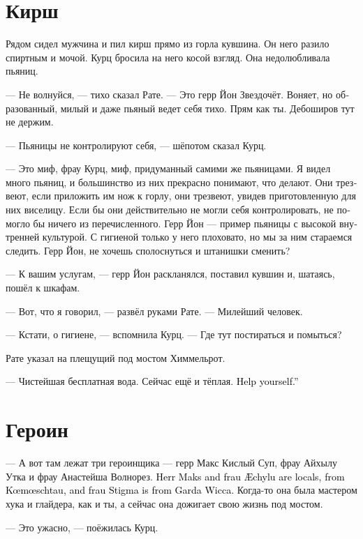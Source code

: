 \documentclass[a4paper,12pt,fleqn]{book}\usepackage{cooltooltips}\usepackage{polyglossia}\setdefaultlanguage[babelshorthands=true]{russian}\setotherlanguage{english}\defaultfontfeatures{Ligatures=TeX,Mapping=tex-text} \usepackage{xcolor}\definecolor{lightgray}{HTML}{bbbbbb}\color{lightgray}\newcommand{\ml}[3]{\textenglish{\textcolor{black}{#3}}}
\begin{document}
\section{Кирш}

Рядом сидел мужчина и пил кирш прямо из горла кувшина.
Он него разило спиртным и мочой.
Курц бросила на него косой взгляд.
Она недолюбливала пьяниц.

--- Не волнуйся, --- тихо сказал Рате.
--- Это герр Йон Звездочёт.
Воняет, но образованный, милый и даже пьяный ведет себя тихо.
Прям как ты.
Дебоширов тут не держим.

--- Пьяницы не контролируют себя, --- шёпотом сказал Курц.

--- Это миф, фрау Курц, миф, придуманный самими же пьяницами.
Я видел много пьяниц, и большинство из них прекрасно понимают, что делают.
Они трезвеют, если приложить им нож к горлу, они трезвеют, увидев приготовленную для них виселицу.
Если бы они действительно не могли себя контролировать, не помогло бы ничего из перечисленного.
Герр Йон --- пример пьяницы с высокой внутренней культурой.
С гигиеной только у него плоховато, но мы за ним стараемся следить.
Герр Йон, не хочешь сполоснуться и штанишки сменить?

--- К вашим услугам, --- герр Йон раскланялся, поставил кувшин и, шатаясь, пошёл к шкафам.

--- Вот, что я говорил, --- развёл руками Рате.
--- Милейший человек.

--- Кстати, о гигиене, --- вспомнила Курц.
--- Где тут постираться и помыться?

Рате указал на плещущий под мостом Химмельрот.

--- Чистейшая бесплатная вода.
Сейчас ещё и тёплая.
\ml{$0$}
{Ни в чём себе не отказывай.}
{Help yourself.''}

\section{Героин}

--- А вот там лежат три героинщика --- герр Макс Кислый Суп, фрау Айхылу Утка и фрау Анастейша Волнорез.
\ml{$0$}
{Герр Макс и фрау Айхылу местные, с Кумуштау, а фрау Стигма родом с Гарда Викки.}
{Herr Maks and frau \AE{}chylu are locals, from K\oe{}m\oe{}schtau, and frau Stigma is from Garda Wicca.}
Когда-то она была мастером хука и глайдера, как и ты, а сейчас она дожигает свою жизнь под мостом.

--- Это ужасно, --- поёжилась Курц.
\end{document}
